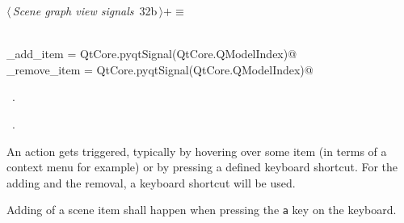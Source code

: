 \documentclass[
    a4paper,      %
    10pt,         %
    openright,    %
    notitlepage,  %
    parskip=half, %
]{scrreprt}       %
\theoremstyle{definition}                    %
\begin{document}
\begin{flushleft} \small
\begin{minipage}{\linewidth}\label{scrap37}\raggedright\small
{} $\langle\,${\itshape Scene graph view signals}\nobreak\ {\footnotesize {32b}}$\,\rangle+\equiv$
\vspace{-1ex}
\begin{list}{}{} \item
\mbox{}\lstinline@@\\
\mbox{}\lstinline@do_add_item = QtCore.pyqtSignal(QtCore.QModelIndex)@\\
\mbox{}\lstinline@do_remove_item = QtCore.pyqtSignal(QtCore.QModelIndex)@\\
\mbox{}\lstinline@@{\NWsep}
\end{list}
\vspace{-1.5ex}
\footnotesize
\begin{list}{}{\setlength{\itemsep}{-\parsep}\setlength{\itemindent}{-\leftmargin}}
\item \NWtxtMacroDefBy\ .
\item \NWtxtMacroRefIn\ .

\item{}
\end{list}
\end{minipage}\vspace{4ex}
\end{flushleft}
An action gets triggered, typically by hovering over some item (in terms of a
context menu for example) or by pressing a defined keyboard shortcut. For the
adding and the removal, a keyboard shortcut will be used.

Adding of a scene item shall happen when pressing the \verb=a= key on the
keyboard.
\end{document}
